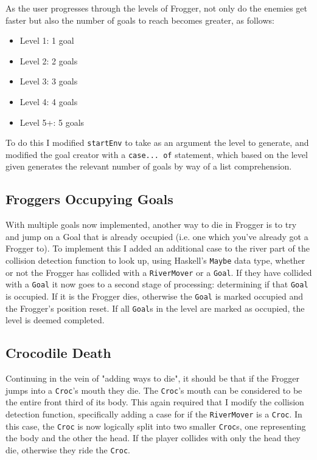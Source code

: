 \documentclass[12pt, a4paper]{report}
\begin{document}
As the user progresses through the levels of Frogger, not only do the enemies get faster but also the number of goals to reach becomes greater, as follows:

\begin{itemize}
  \item Level 1: 1 goal
  \item Level 2: 2 goals
  \item Level 3: 3 goals
  \item Level 4: 4 goals
  \item Level 5+: 5 goals
\end{itemize}

To do this I modified \verb|startEnv| to take as an argument the level to generate, and modified the goal creator with a \verb|case... of| statement, which based on the level given generates the relevant number of goals by way of a list comprehension.

\subsection{Froggers Occupying Goals}

With multiple goals now implemented, another way to die in Frogger is to try and jump on a Goal that is already occupied (i.e. one which you've already got a Frogger to).
To implement this I added an additional case to the river part of the collision detection function to look up, using Haskell's \verb|Maybe| data type, whether or not the Frogger has collided with a \verb|RiverMover| or a \verb|Goal|.
If they have collided with a \verb|Goal| it now goes to a second stage of processing: determining if that \verb|Goal| is occupied.
If it is the Frogger dies, otherwise the \verb|Goal| is marked occupied and the Frogger's position reset.
If all \verb|Goal|s in the level are marked as occupied, the level is deemed completed.

\subsection{Crocodile Death}

Continuing in the vein of "adding ways to die", it should be that if the Frogger jumps into a \verb|Croc|'s mouth they die.
The \verb|Croc|'s mouth can be considered to be the entire front third of its body.
This again required that I modify the collision detection function, specifically adding a case for if the \verb|RiverMover| is a \verb|Croc|.
In this case, the \verb|Croc| is now logically split into two smaller \verb|Croc|s, one representing the body and the other the head.
If the player collides with only the head they die, otherwise they ride the \verb|Croc|.
\end{document}
